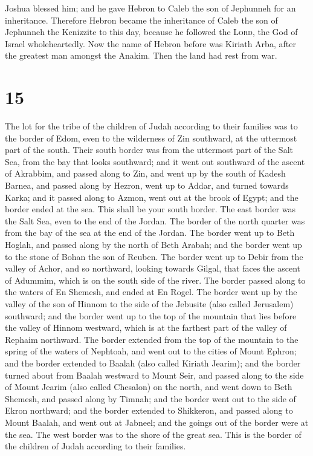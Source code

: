  Joshua blessed him; and he gave Hebron to Caleb the son
of Jephunneh for an inheritance.  Therefore Hebron became
the inheritance of Caleb the son of Jephunneh the Kenizzite to this day,
because he followed the \textsc{Lord}, the God of Israel wholeheartedly.
 Now the name of Hebron before was Kiriath Arba, after
the greatest man amongst the Anakim. Then the land had rest from war.

\hypertarget{section-14}{%
\section{15}\label{section-14}}

 The lot for the tribe of the children of Judah according
to their families was to the border of Edom, even to the wilderness of
Zin southward, at the uttermost part of the south.  Their
south border was from the uttermost part of the Salt Sea, from the bay
that looks southward;  and it went out southward of the
ascent of Akrabbim, and passed along to Zin, and went up by the south of
Kadesh Barnea, and passed along by Hezron, went up to Addar, and turned
towards Karka;  and it passed along to Azmon, went out at
the brook of Egypt; and the border ended at the sea. This shall be your
south border.  The east border was the Salt Sea, even to
the end of the Jordan. The border of the north quarter was from the bay
of the sea at the end of the Jordan.  The border went up
to Beth Hoglah, and passed along by the north of Beth Arabah; and the
border went up to the stone of Bohan the son of Reuben. 
The border went up to Debir from the valley of Achor, and so northward,
looking towards Gilgal, that faces the ascent of Adummim, which is on
the south side of the river. The border passed along to the waters of En
Shemesh, and ended at En Rogel.  The border went up by the
valley of the son of Hinnom to the side of the Jebusite (also called
Jerusalem) southward; and the border went up to the top of the mountain
that lies before the valley of Hinnom westward, which is at the farthest
part of the valley of Rephaim northward.  The border
extended from the top of the mountain to the spring of the waters of
Nephtoah, and went out to the cities of Mount Ephron; and the border
extended to Baalah (also called Kiriath Jearim);  and the
border turned about from Baalah westward to Mount Seir, and passed along
to the side of Mount Jearim (also called Chesalon) on the north, and
went down to Beth Shemesh, and passed along by Timnah; 
and the border went out to the side of Ekron northward; and the border
extended to Shikkeron, and passed along to Mount Baalah, and went out at
Jabneel; and the goings out of the border were at the sea.
 The west border was to the shore of the great sea. This
is the border of the children of Judah according to their families.

